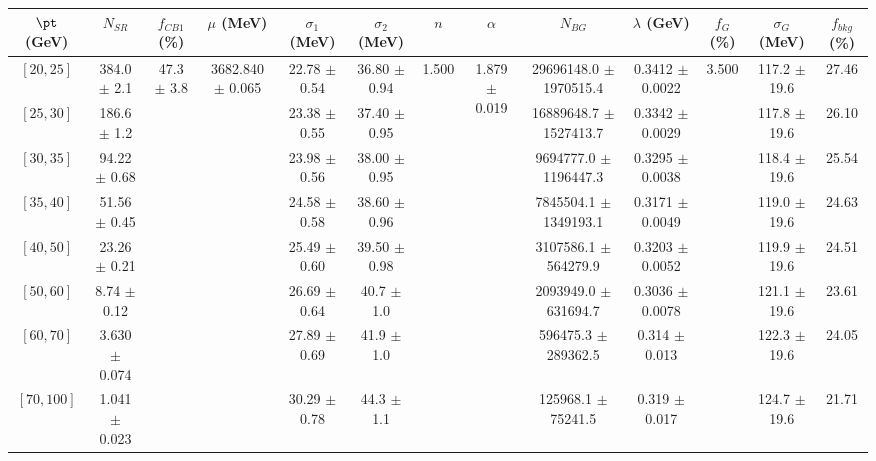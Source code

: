 \begin{tabular}{c||c|c|c|c|c|c|c|c|c|c|c||c}
$\pt$ (GeV) & $N_{SR}$ & $f_{CB1}$ (\%) & $\mu$ (MeV) & $\sigma_1$ (MeV) & $\sigma_2$ (MeV) & $n$ & $\alpha$ & $N_{BG}$ & $\lambda$ (GeV) & $f_G$ (\%) & $\sigma_G$ (MeV) & $f_{bkg}$ (\%) \\
\hline
$[20, 25]$ & 384.0 $\pm$ 2.1 & \multirow{8}{*}{47.3 $\pm$ 3.8} & \multirow{8}{*}{3682.840 $\pm$ 0.065} & 22.78 $\pm$ 0.54 & 36.80 $\pm$ 0.94 & \multirow{8}{*}{1.500} & \multirow{8}{*}{1.879 $\pm$ 0.019} & 29696148.0 $\pm$ 1970515.4 & 0.3412 $\pm$ 0.0022 & \multirow{8}{*}{3.500} & 117.2 $\pm$ 19.6 & 27.46\\
$[25, 30]$ & 186.6 $\pm$ 1.2 &  &  & 23.38 $\pm$ 0.55 & 37.40 $\pm$ 0.95 &  &  & 16889648.7 $\pm$ 1527413.7 & 0.3342 $\pm$ 0.0029 &  & 117.8 $\pm$ 19.6 & 26.10\\
$[30, 35]$ & 94.22 $\pm$ 0.68 &  &  & 23.98 $\pm$ 0.56 & 38.00 $\pm$ 0.95 &  &  & 9694777.0 $\pm$ 1196447.3 & 0.3295 $\pm$ 0.0038 &  & 118.4 $\pm$ 19.6 & 25.54\\
$[35, 40]$ & 51.56 $\pm$ 0.45 &  &  & 24.58 $\pm$ 0.58 & 38.60 $\pm$ 0.96 &  &  & 7845504.1 $\pm$ 1349193.1 & 0.3171 $\pm$ 0.0049 &  & 119.0 $\pm$ 19.6 & 24.63\\
$[40, 50]$ & 23.26 $\pm$ 0.21 &  &  & 25.49 $\pm$ 0.60 & 39.50 $\pm$ 0.98 &  &  & 3107586.1 $\pm$ 564279.9 & 0.3203 $\pm$ 0.0052 &  & 119.9 $\pm$ 19.6 & 24.51\\
$[50, 60]$ & 8.74 $\pm$ 0.12 &  &  & 26.69 $\pm$ 0.64 & 40.7 $\pm$ 1.0 &  &  & 2093949.0 $\pm$ 631694.7 & 0.3036 $\pm$ 0.0078 &  & 121.1 $\pm$ 19.6 & 23.61\\
$[60, 70]$ & 3.630 $\pm$ 0.074 &  &  & 27.89 $\pm$ 0.69 & 41.9 $\pm$ 1.0 &  &  & 596475.3 $\pm$ 289362.5 & 0.314 $\pm$ 0.013 &  & 122.3 $\pm$ 19.6 & 24.05\\
$[70, 100]$ & 1.041 $\pm$ 0.023 &  &  & 30.29 $\pm$ 0.78 & 44.3 $\pm$ 1.1 &  &  & 125968.1 $\pm$ 75241.5 & 0.319 $\pm$ 0.017 &  & 124.7 $\pm$ 19.6 & 21.71\\
\end{tabular}
